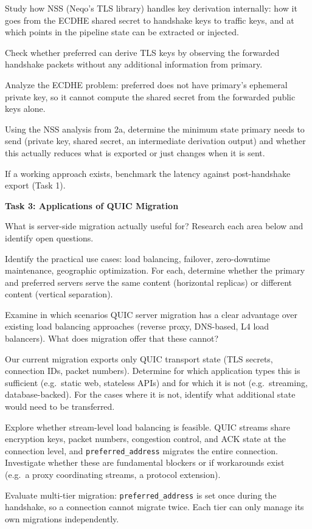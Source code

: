\documentclass[11pt]{article}
\begin{document}
\begin{tasklist}
\item[2a.] Study how NSS (Neqo's TLS library) handles key derivation internally: how it goes from the ECDHE shared secret to handshake keys to traffic keys, and at which points in the pipeline state can be extracted or injected.
\item[2b.] Check whether preferred can derive TLS keys by observing the forwarded handshake packets without any additional information from primary.
\item[2c.] Analyze the ECDHE problem: preferred does not have primary's ephemeral private key, so it cannot compute the shared secret from the forwarded public keys alone.
\item[2d.] Using the NSS analysis from 2a, determine the minimum state primary needs to send (private key, shared secret, an intermediate derivation output) and whether this actually reduces what is exported or just changes when it is sent.
\item[2e.] If a working approach exists, benchmark the latency against post-handshake export (Task 1).
\end{tasklist}

\bigskip
\textbf{Task 3: Applications of QUIC Migration}

What is server-side migration actually useful for? Research each area below and identify open questions.

\begin{tasklist}
\item[3a.] Identify the practical use cases: load balancing, failover, zero-downtime maintenance, geographic optimization. For each, determine whether the primary and preferred servers serve the same content (horizontal replicas) or different content (vertical separation).
\item[3b.] Examine in which scenarios QUIC server migration has a clear advantage over existing load balancing approaches (reverse proxy, DNS-based, L4 load balancers). What does migration offer that these cannot?
\item[3c.] Our current migration exports only QUIC transport state (TLS secrets, connection IDs, packet numbers). Determine for which application types this is sufficient (e.g.\ static web, stateless APIs) and for which it is not (e.g.\ streaming, database-backed). For the cases where it is not, identify what additional state would need to be transferred.
\item[3d.] Explore whether stream-level load balancing is feasible. QUIC streams share encryption keys, packet numbers, congestion control, and ACK state at the connection level, and \texttt{preferred\_address} migrates the entire connection. Investigate whether these are fundamental blockers or if workarounds exist (e.g.\ a proxy coordinating streams, a protocol extension).
\item[3e.] Evaluate multi-tier migration: \texttt{preferred\_address} is set once during the handshake, so a connection cannot migrate twice. Each tier can only manage its own migrations independently.
\end{tasklist}
\end{document}
